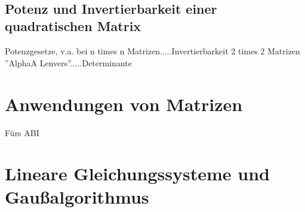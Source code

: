 \documentclass[main.tex]{subfiles}
\begin{document}
\\

\subsection{Potenz und Invertierbarkeit einer quadratischen Matrix}

Potenzgesetze, v.a. bei n times n Matrizen.....Invertierbarkeit 2 times 2 Matrizen ''AlphaA Lenvers''.....Determinante






	\section{Anwendungen von Matrizen}

Fürs ABI

	\section{Lineare Gleichungssysteme und Gaußalgorithmus}
\end{document}

